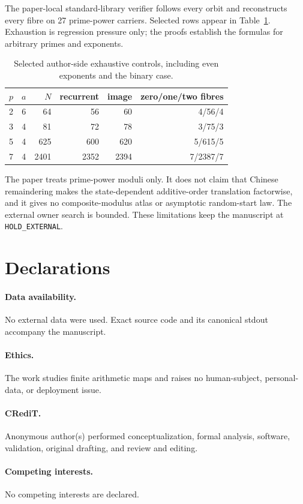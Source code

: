 \documentclass[a4paper,10pt]{amsart}
\theoremstyle{remark}
\begin{document}
The paper-local standard-library verifier follows every orbit and reconstructs
every fibre on 27 prime-power carriers.  Selected rows appear in
Table~\ref{tab:control}.  Exhaustion is regression pressure only; the proofs
establish the formulas for arbitrary primes and exponents.

\begin{table}[h]
\centering
\small
\begin{tabular}{ccrrrr}
\hline
$p$&$a$&$N$&recurrent&image&zero/one/two fibres\\
\hline
2&6&64&56&60&4/56/4\\
3&4&81&72&78&3/75/3\\
5&4&625&600&620&5/615/5\\
7&4&2401&2352&2394&7/2387/7\\
\hline
\end{tabular}
\caption{Selected author-side exhaustive controls, including even exponents
and the binary case.}
\label{tab:control}
\end{table}

The paper treats prime-power moduli only.  It does not claim that Chinese
remaindering makes the state-dependent additive-order translation factorwise,
and it gives no composite-modulus atlas or asymptotic random-start law.  The
external owner search is bounded.  These limitations keep the manuscript at
\texttt{HOLD\_EXTERNAL}.

\section*{Declarations}

\paragraph{Data availability.} No external data were used.  Exact source code
and its canonical stdout accompany the manuscript.
\paragraph{Ethics.} The work studies finite arithmetic maps and raises no
human-subject, personal-data, or deployment issue.
\paragraph{CRediT.} Anonymous author(s) performed conceptualization, formal
analysis, software, validation, original drafting, and review and editing.
\paragraph{Competing interests.} No competing interests are declared.
\end{document}
